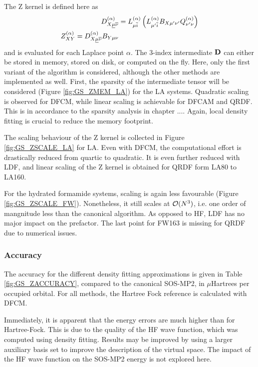 The Z kernel is defined here as
\begin{align}
D^{(\alpha)}_{X\underline{\mu}\overline{\nu}} &= L^{(\alpha)}_{\mu\overline{i}} \left( L^{(\alpha)}_{\mu' \overline{i}} B_{X\mu'\nu'}  Q^{(\alpha)}_{\nu'\nu} \right) \\
Z_{XY}^{(\alpha)} = D^{(\alpha)}_{X\underline{\mu}\overline{\nu}} B_{Y\mu\nu}
\end{align}
\noindent and is evaluated for each Laplace point $\alpha$. The 3-index intermediate $\mathbf{D}$ can either be stored in memory, stored on disk, or computed on the fly. Here, only the first variant of the algorithm is considered, although the other methods are implemented as well. First, the sparsity of the intermediate tensor will be considered (Figure \ref{fig:GS_ZMEM_LA}) for the LA systems. Quadratic scaling is observed for DFCM, while linear scaling is achievable for DFCAM and QRDF. This is in accordance to the sparsity analysis in chapter .... Again, local density fitting is crucial to reduce the memory footprint.

The scaling behaviour of the Z kernel is collected in Figure \ref{fig:GS_ZSCALE_LA} for LA. Even with DFCM, the computational effort is drastically reduced from quartic to quadratic. It is even further reduced with LDF, and linear scaling of the Z kernel is obtained for QRDF form LA80 to LA160. 

For the hydrated formamide systems, scaling is again less favourable (Figure \ref{fig:GS_ZSCALE_FW}). Nonetheless, it still scales at $\mathcal{O}(N^{3})$, i.e. one order of mangnitude less than the canonical algorithm. As opposed to HF, LDF has no major impact on the prefactor. The last point for FW163 is missing for QRDF due to numerical issues.  

\subsubsection{Accuracy}

The accuracy for the different density fitting approximations is given in Table \ref{fig:GS_ZACCURACY}, compared to the canonical SOS-MP2, in $\mu$Hartrees per occupied orbital. For all methods, the Hartree Fock reference is calculated with DFCM.

Immediately, it is apparent that the energy errors are much higher than for Hartree-Fock. This is due to the quality of the HF wave function, which was computed using density fitting. Results may be improved by using a larger auxiliary basis set to improve the description of the virtual space. The impact of the HF wave function on the SOS-MP2 energy is not explored here.

